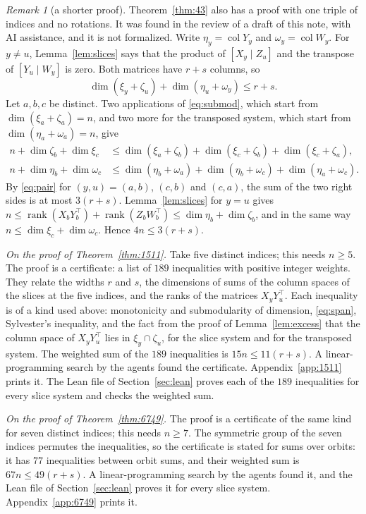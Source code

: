 \documentclass[11pt]{amsart}
\theoremstyle{remark}
\newtheorem{remark}[theorem]{Remark}
\newcommand{\rk}{\operatorname{rank}}
\newcommand{\col}{\operatorname{col}}
\begin{document}
\begin{remark}[a shorter proof]\label{rem:short}
Theorem~\ref{thm:43} also has a proof with one triple of indices and no rotations. It was found in the review
of a draft of this note, with AI assistance, and it is not formalized. Write $\eta_y=\col Y_y$ and
$\omega_y=\col W_y$. For $y\ne u$, Lemma~\ref{lem:slices} says that the product of $[X_y\mid Z_u]$ and the
transpose of $[Y_u\mid W_y]$ is zero. Both matrices have $r+s$ columns, so
\begin{equation}\label{eq:pair}
  \dim(\xi_y+\zeta_u)+\dim(\eta_u+\omega_y)\le r+s.
\end{equation}
Let $a,b,c$ be distinct. Two applications of \eqref{eq:submod}, which start from $\dim(\xi_a+\zeta_a)=n$, and
two more for the transposed system, which start from $\dim(\eta_a+\omega_a)=n$, give
\begin{align*}
  n+\dim\zeta_b+\dim\xi_c&\le\dim(\xi_a+\zeta_b)+\dim(\xi_c+\zeta_b)+\dim(\xi_c+\zeta_a),\\
  n+\dim\eta_b+\dim\omega_c&\le\dim(\eta_b+\omega_a)+\dim(\eta_b+\omega_c)+\dim(\eta_a+\omega_c).
\end{align*}
By \eqref{eq:pair} for $(y,u)=(a,b)$, $(c,b)$ and $(c,a)$, the sum of the two right sides is at most $3(r+s)$.
Lemma~\ref{lem:slices} for $y=u$ gives $n\le\rk(X_bY_b^{\top})+\rk(Z_bW_b^{\top})\le\dim\eta_b+\dim\zeta_b$, and
in the same way $n\le\dim\xi_c+\dim\omega_c$. Hence $4n\le3(r+s)$.
\end{remark}

\emph{On the proof of Theorem~\ref{thm:1511}.} Take five distinct indices; this needs $n\ge5$. The proof
is a certificate: a list of $189$ inequalities with positive integer weights. They relate the widths $r$ and $s$, the
dimensions of sums of the column spaces of the slices at the five indices, and the ranks of the matrices
$X_yY_u^{\top}$. Each inequality is of a kind used above: monotonicity and submodularity of dimension,
\eqref{eq:span}, Sylvester's inequality, and the fact from the proof of Lemma~\ref{lem:excess} that the
column space of $X_yY_u^{\top}$ lies in $\xi_y\cap\zeta_u$, for the slice system and for the transposed
system. The weighted sum of the $189$ inequalities is $15n\le11(r+s)$. A linear-programming search by the
agents found the certificate. Appendix~\ref{app:1511} prints it. The Lean file of Section~\ref{sec:lean} proves each of
the $189$ inequalities for every slice system and checks the weighted sum.

\emph{On the proof of Theorem~\ref{thm:6749}.} The proof is a certificate of the same kind for seven
distinct indices; this needs $n\ge7$. The symmetric group of the seven indices permutes the inequalities, so
the certificate is stated for sums over orbits: it has $77$ inequalities between orbit sums, and their
weighted sum is $67n\le49(r+s)$. A linear-programming search by the agents found it, and the Lean file of
Section~\ref{sec:lean} proves it for every slice system. Appendix~\ref{app:6749} prints it.
\end{document}
